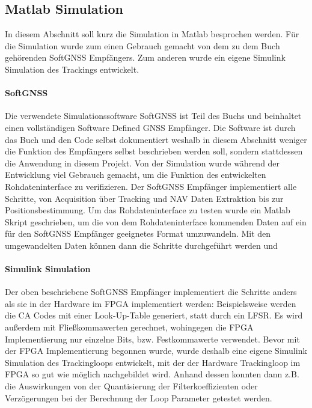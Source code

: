 \subsection{Matlab Simulation}
In diesem Abschnitt soll kurz die Simulation in Matlab besprochen werden. Für die Simulation wurde zum einen Gebrauch gemacht von dem zu dem Buch \cite{borre2007software} gehörenden SoftGNSS Empfängers. Zum anderen wurde ein eigene Simulink Simulation des Trackings entwickelt. 

\paragraph{SoftGNSS} Die verwendete Simulationssoftware SoftGNSS ist Teil des Buchs \cite{borre2007software} und beinhaltet einen vollständigen Software Defined GNSS Empfänger. Die Software ist durch das Buch und den Code selbst dokumentiert weshalb in diesem Abschnitt weniger die Funktion des Empfängers selbst beschrieben werden soll, sondern stattdessen die Anwendung in diesem Projekt. Von der Simulation wurde während der Entwicklung viel Gebrauch gemacht, um die Funktion des entwickelten Rohdateninterface zu verifizieren. Der SoftGNSS Empfänger implementiert alle Schritte, von Acquisition über Tracking und NAV Daten Extraktion bis zur Positionsbestimmung. Um das Rohdateninterface zu testen wurde ein Matlab Skript geschrieben, um die von dem Rohdateninterface kommenden Daten auf ein für den SoftGNSS Empfänger geeignetes Format umzuwandeln. Mit den umgewandelten Daten können dann die Schritte durchgeführt werden und 

\paragraph{Simulink Simulation}
Der oben beschriebene SoftGNSS Empfänger implementiert die Schritte anders als sie in der Hardware im FPGA implementiert werden: Beispielsweise werden die \gls{CA} Codes mit einer Look-Up-Table generiert, statt durch ein LFSR. Es wird außerdem mit Fließkommawerten gerechnet, wohingegen die FPGA Implementierung nur einzelne Bits, bzw. Festkommawerte verwendet. Bevor mit der FPGA Implementierung begonnen wurde, wurde deshalb eine eigene Simulink Simulation des Trackingloops entwickelt, mit der der Hardware Trackingloop im FPGA so gut wie möglich nachgebildet wird. Anhand dessen konnten dann z.B. die Auswirkungen von  der Quantisierung der Filterkoeffizienten oder Verzögerungen bei der Berechnung der Loop Parameter getestet werden. 



